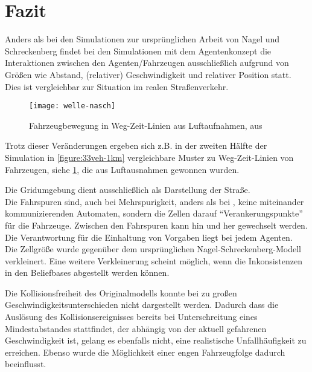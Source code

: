 \section{Fazit}
\label{sec:fazit}

Anders als bei den Simulationen zur ursprünglichen Arbeit von Nagel und Schreckenberg \cite{na-sch} findet bei den Simulationen mit dem Agentenkonzept %
die Interaktionen zwischen den Agenten/Fahrzeugen ausschließlich aufgrund von Größen wie Abstand, (relativer) Geschwindigkeit und relativer Position statt.
Dies ist vergleichbar zur Situation im realen Straßenverkehr.

\begin{figure}[hptb]
 \centering
 \texttt{[image: welle-nasch]}
 \caption[Fahrzeugbewegung in Weg-Zeit-Linien aus Luftaufnahmen]
 		{Fahrzeugbewegung in Weg-Zeit-Linien aus Luftaufnahmen, aus \cite[Fig. 3]{na-sch}}
 \label{figure:welle-nasch}
\end{figure}

Trotz dieser Veränderungen ergeben sich z.B. in der zweiten Hälfte der Simulation in \cref{figure:33veh-1km} vergleichbare Muster zu Weg-Zeit-Linien von Fahrzeugen, siehe \cref{figure:welle-nasch}, die aus Luftausnahmen gewonnen wurden.

Die Gridumgebung dient ausschließlich als Darstellung der Straße.
\\
Die Fahrspuren sind, auch bei Mehrspurigkeit, anders als bei \cite{multi-fuzzy}, keine miteinander kommunizierenden Automaten, sondern die Zellen darauf \enquote{Verankerungspunkte} für die Fahrzeuge.
Zwischen den Fahrspuren kann hin und her gewechselt werden.
Die Verantwortung für die Einhaltung von Vorgaben liegt bei jedem Agenten.
\\
Die Zellgröße wurde gegenüber dem ursprünglichen Nagel-Schreckenberg-Modell verkleinert.
Eine weitere Verkleinerung scheint möglich, wenn die Inkonsistenzen in den Beliefbases abgestellt werden können.

Die Kollisionsfreiheit des Originalmodells konnte bei zu großen Geschwindigkeitsunterschieden nicht dargestellt werden.
Dadurch dass die Auslösung des Kollisionsereignisses bereits bei Unterschreitung eines Mindestabstandes stattfindet, der abhängig von der aktuell gefahrenen Geschwindigkeit ist, gelang es ebenfalls nicht, eine realistische Unfallhäufigkeit zu erreichen.
Ebenso wurde die Möglichkeit einer engen Fahrzeugfolge dadurch beeinflusst.

